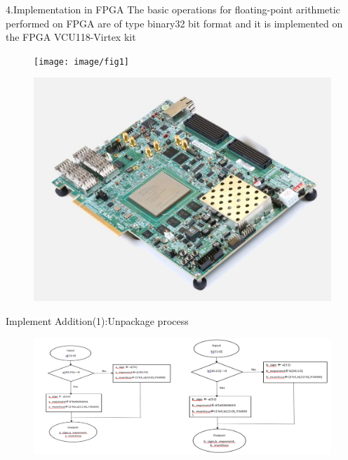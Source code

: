 \documentclass[11pt]{beamer}
\begin{document}
\begin{frame}[t]{4.Implementation in FPGA}
The basic operations for floating-point arithmetic performed on FPGA are of type binary32 bit format and it is implemented on the FPGA VCU118-Virtex kit
\begin{center}
    \begin{figure}[htp]
    \begin{center}
     \texttt{[image: image/fig1]}
    \end{center}
    \label{reffig1}
    \end{figure}
\end{center}
\begin{center}
    \begin{figure}[htp]
    \begin{center}
     \includegraphics[scale=.3]{image/fig31}
    \end{center}
    \label{reffig31}
    \end{figure}
\end{center}

\end{frame}
\begin{frame}[t]{Implement Addition(1):Unpackage process}
\begin{center}
    \begin{figure}[htp]
    \begin{center}
     \includegraphics[scale=.33]{image/fig11}
    \end{center}
    \label{reffig11}
    \end{figure}
\end{center}
\end{frame}
\end{document}
